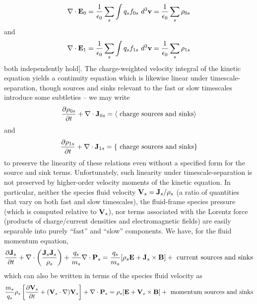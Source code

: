 \begin{equation}
\nabla \cdot {\bf E}_{0} = {1 \over \epsilon_{0}} \sum_{s} \int q_{s} f_{0s}~d^{3}{\bf v}
= {1 \over \epsilon_{0}} \sum_{s} \rho_{0s}
\end{equation}
and
\begin{equation}
\nabla \cdot {\bf E}_{1} = {1 \over \epsilon_{0}} \sum_{s} \int q_{s} f_{1s}~d^{3}{\bf v}
= {1 \over \epsilon_{0}} \sum_{s} \rho_{1s}
\end{equation}
both independently hold].  The charge-weighted velocity integral of the kinetic equation yields a
continuity equation which is likewise linear under timescale-separation, though
sources and sinks relevant to the fast or slow timescales introduce some subtleties -- we
may write
\begin{equation}
{\partial \rho_{0s} \over \partial t} + \nabla \cdot {\bf J}_{0s} = \langle \mbox{~charge sources and sinks} \rangle
\end{equation}
and
\begin{equation}
{\partial \rho_{1s} \over \partial t} + \nabla \cdot {\bf J}_{1s} = \{ \mbox{~charge sources and sinks} \}
\end{equation}
to preserve the linearity of these relations even without a specified form for the source and sink
terms.  
Unfortunately, such linearity under timescale-separation is not preserved by higher-order
velocity moments of the kinetic equation.
In particular, neither the species fluid velocity ${\bf V}_{s} = {\bf J}_{s}/\rho_{s}$ (a ratio of 
quantities that vary on both fast and slow timescales), the fluid-frame species pressure (which 
is computed relative to ${\bf V}_{s}$), 
nor terms associated with the Lorentz force (products of charge/current
densities and electromagnetic fields) are easily separable into purely ``fast'' and ``slow''
components.  We have, for the fluid momentum equation,
\begin{eqnarray}
{\partial {\bf J}_{s} \over \partial t} + \nabla \cdot \left( {{\bf J}_{s} {\bf J}_{s} \over \rho_{s}} \right)
+ {q_{s} \over m_{s}} \nabla \cdot {\mathbf P}_{s} = {q_{s} \over m_{s}} [\rho_{s} {\bf E} + {\bf J}_{s}
\times {\bf B}] + \mbox{~current sources and sinks}
\label{fluidmomentum}
\end{eqnarray}
which can also be written in terms of the species fluid velocity as
\begin{eqnarray}
{m_{s} \over q_{s}} \rho_{s} \left[ {\partial {\bf V}_{s} \over \partial t} +
({\bf V}_{s} \cdot \nabla) {\bf V}_{s} \right] + \nabla \cdot {\mathbf P}_{s} =
\rho_{s}[{\bf E} + {\bf V}_{s} \times {\bf B}] + \mbox{~momentum sources and sinks}
\end{eqnarray} 

